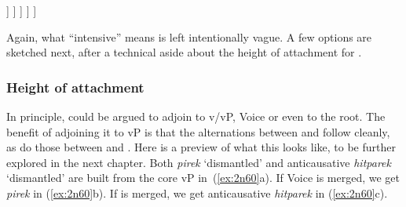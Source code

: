 \begin{exe}
\begin{xlist}
\begin{exe}
\begin{xlist}
\begin{exe}
\begin{xlist}
\begin{exe}
\begin{exe}
\begin{xlist}
\begin{exe}
\begin{xlist}
\begin{exe}
\begin{xlist}
\begin{exe}
\begin{xlist}
\begin{exe}
\begin{xlist}
\begin{exe}
\begin{xlist}
\begin{exe}
\begin{xlist}
\begin{exe}
\begin{xlist}
\begin{xlist}
\begin{exe}
\begin{xlist}
\begin{exe}
\begin{xlist}
\begin{exe}
\begin{xlist}
\begin{exe}
\begin{xlist}
\begin{exe}
\begin{xlist}
\begin{exe}
\begin{xlist}
\begin{exe}
\begin{xlist}
\begin{exe}
\begin{xlist}
\begin{exe}
\begin{xlist}
\begin{exe}
\begin{xlist}
\begin{exe}
\begin{xlist}
\begin{exe}
\begin{xlist}
\begin{xlist}
\begin{xlist}
\begin{exe}
\begin{xlist}
\begin{xlist}
\begin{xlist}
\begin{exe}
\begin{exe}
\begin{xlist}
\begin{exe}
\begin{xlist}
\begin{exe}
\begin{xlist}
\begin{exe}
\begin{xlist}
\begin{exe}
\begin{xlist}
\begin{exe}
\begin{xlist}
\begin{exe}
\begin{xlist}
\begin{exe}
\begin{exe}
\begin{xlist}
\begin{xlist}
\begin{exe}
\begin{xlist}
\begin{exe}
\begin{xlist}
\begin{exe}
\begin{xlist}
\begin{exe}
\begin{xlist}
\begin{exe}
\begin{xlist}
\begin{exe}
\begin{xlist}
\begin{exe}
\begin{exe}
\begin{exe}
\begin{xlist}
]
				]
			]
		]
	]
 \z
\z 

Again, what ``intensive'' means is left intentionally vague. A few options are sketched next, after a technical aside about the height of attachment for {\va}.

		\subsubsection{Height of attachment} \label{voice:va:syn:wonk}
In principle, {\va} could be argued to adjoin to v/vP, Voice or even to the root. The benefit of adjoining it to vP is that the alternations between {\tkal} and {\tpie} follow cleanly, as do those between {\tpie} and {\thit}. Here is a preview of what this looks like, to be further explored in the next chapter. Both  \emph{pirek} `dismantled' and anticausative \emph{hitparek} `dismantled' are built from the core vP in~(\ref{ex:2n60}a). If Voice is merged, we get  \emph{pirek} in {\tpie} (\ref{ex:2n60}b). If {\vz} is merged, we get anticausative \emph{hitparek} in {\thit} (\ref{ex:2n60}c).
 \begin{exe}
 \ex  \label{ex:2n60}

\end{exe}
\end{xlist}
\end{exe}
\end{exe}
\end{exe}
\end{xlist}
\end{exe}
\end{xlist}
\end{exe}
\end{xlist}
\end{exe}
\end{xlist}
\end{exe}
\end{xlist}
\end{exe}
\end{xlist}
\end{exe}
\end{xlist}
\end{xlist}
\end{exe}
\end{exe}
\end{xlist}
\end{exe}
\end{xlist}
\end{exe}
\end{xlist}
\end{exe}
\end{xlist}
\end{exe}
\end{xlist}
\end{exe}
\end{xlist}
\end{exe}
\end{xlist}
\end{exe}
\end{exe}
\end{xlist}
\end{xlist}
\end{xlist}
\end{exe}
\end{xlist}
\end{xlist}
\end{xlist}
\end{exe}
\end{xlist}
\end{exe}
\end{xlist}
\end{exe}
\end{xlist}
\end{exe}
\end{xlist}
\end{exe}
\end{xlist}
\end{exe}
\end{xlist}
\end{exe}
\end{xlist}
\end{exe}
\end{xlist}
\end{exe}
\end{xlist}
\end{exe}
\end{xlist}
\end{exe}
\end{xlist}
\end{exe}
\end{xlist}
\end{xlist}
\end{exe}
\end{xlist}
\end{exe}
\end{xlist}
\end{exe}
\end{xlist}
\end{exe}
\end{xlist}
\end{exe}
\end{xlist}
\end{exe}
\end{xlist}
\end{exe}
\end{xlist}
\end{exe}
\end{exe}
\end{xlist}
\end{exe}
\end{xlist}
\end{exe}
\end{xlist}
\end{exe}

